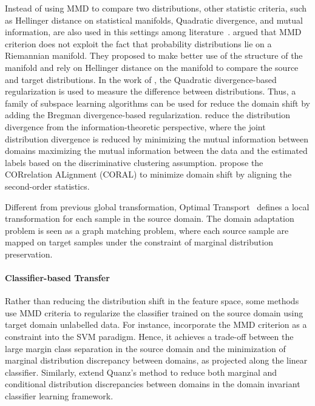 \documentclass[prodmode]{acmsmall}  %
\begin{document}
Instead of using MMD to compare two distributions, other statistic criteria, such as Hellinger distance on statistical manifolds, Quadratic divergence, and mutual information, are also used in this settings among literature~\cite{Baktashmotlagh2014,Si2010,Jhuo2012,Shi2012}.  argued that MMD criterion does not exploit the fact that probability distributions lie on a Riemannian manifold. They proposed to make better use of the structure of the manifold and rely on Hellinger distance on the manifold to compare the source and target distributions. In the work of , the Quadratic divergence-based regularization is used to measure the difference between distributions. Thus, a family of subspace learning algorithms can be used for reduce the domain shift by adding the Bregman divergence-based regularization.  reduce the distribution divergence from the information-theoretic perspective, where the joint distribution divergence is reduced by minimizing the mutual information between domains maximizing the mutual information between the data and the estimated labels based on the discriminative clustering assumption.  propose the CORrelation ALignment (CORAL) to minimize domain shift by aligning the second-order statistics.

Different from previous global transformation, Optimal Transport~\cite{Courty2016} defines a local transformation for each sample in the source domain. The domain adaptation problem is seen as a graph matching problem, where each source sample are mapped on target samples under the constraint of marginal distribution preservation.

\paragraph{Classifier-based Transfer}
Rather than reducing the distribution shift in the feature space, some methods use MMD criteria to regularize the classifier trained on the source domain using target domain unlabelled data. For instance,  incorporate the MMD criterion as a constraint into the SVM paradigm. Hence, it achieves a trade-off between the large margin class separation in the source domain and the minimization of marginal distribution discrepancy between domains, as projected along the linear classifier. Similarly,  extend Quanz's method to reduce both marginal and conditional distribution discrepancies between domains in the domain invariant classifier learning framework.
\end{document}
